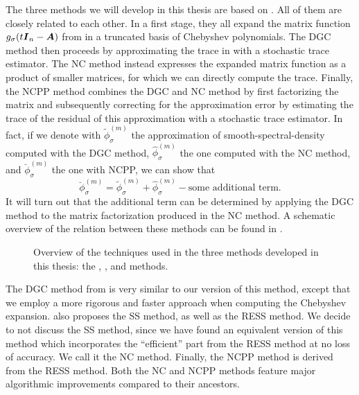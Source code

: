 The three methods we will develop in this thesis are based on \cite{lin2017randomized}.
All of them are closely related to each other. In a first stage, they all expand the matrix
function $g_{\sigma}(t\boldsymbol{I}_n - \boldsymbol{A})$ from
 in a truncated basis of
Chebyshev polynomials. The \gls{DGC} method then proceeds by approximating the
trace in  with a stochastic
trace estimator. The \gls{NC} method instead expresses the expanded matrix function
as a product of smaller matrices, for which we can directly compute the trace.
Finally, the \gls{NCPP} method combines the \gls{DGC} and \gls{NC} method
by first factorizing the matrix and subsequently correcting for the approximation
error by estimating the trace of the residual of this approximation with a stochastic trace estimator.
In fact, if we denote with $\widetilde{\phi}_{\sigma}^{(m)}$ the approximation
of \gls{smooth-spectral-density} computed with the \gls{DGC} method, $\widehat{\phi}_{\sigma}^{(m)}$ the
one computed with the \gls{NC} method, and $\breve{\phi}_{\sigma}^{(m)}$ the one
with \gls{NCPP}, we can show that
\begin{equation}
    \breve{\phi}_{\sigma}^{(m)} = \widetilde{\phi}_{\sigma}^{(m)} + \widehat{\phi}_{\sigma}^{(m)} - \text{some additional term}.
    \label{equ:1-introduction-relation-methods}
\end{equation}
It will turn out that the additional term can be determined by applying
the \gls{DGC} method to the matrix factorization produced in the \gls{NC} method.
A schematic overview of the relation between these methods can be found
in .

\begin{figure}[ht]
    \centering
    
    \caption{Overview of the techniques used in the three methods developed
    in this thesis: the , , and  methods.}
    \label{fig:1-introduction-methods-overview}
\end{figure}

The \gls{DGC} method from \cite{lin2017randomized} is very similar to our version
of this method, except that we employ a more rigorous and faster approach when
computing the Chebyshev expansion. \cite{lin2017randomized} also proposes the
\gls{SS} method, as well as the \gls{RESS} method. We decide to not discuss the
\gls{SS} method, since we have found an equivalent version of this method which
incorporates the \enquote{efficient} part from the \gls{RESS} method at no loss
of accuracy. We call it the \gls{NC} method.
Finally, the \gls{NCPP} method is derived from the \gls{RESS} method. Both the
\gls{NC} and \gls{NCPP} methods feature major algorithmic improvements compared
to their ancestors.

